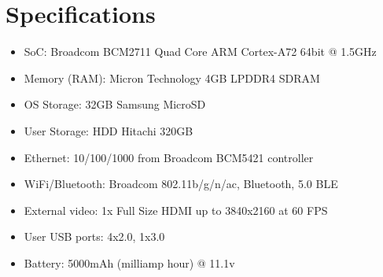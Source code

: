 \documentclass[12pt]{article}
\begin{document}
\pagebreak

\section{Specifications}
\begin{itemize}
\item SoC: Broadcom BCM2711 Quad Core ARM Cortex-A72 64bit @ 1.5GHz
\item Memory (RAM): Micron Technology 4GB LPDDR4 SDRAM
\item OS Storage: 32GB Samsung MicroSD
\item User Storage: HDD Hitachi 320GB
\item Ethernet: 10/100/1000 from Broadcom BCM5421 controller 
\item WiFi/Bluetooth: Broadcom 802.11b/g/n/ac, Bluetooth, 5.0 BLE
\item External video: 1x Full Size HDMI up to 3840x2160 at 60 FPS
\item User USB ports: 4x2.0, 1x3.0
\item Battery: 5000mAh (milliamp hour) @ 11.1v
\end{itemize}
\end{document}
